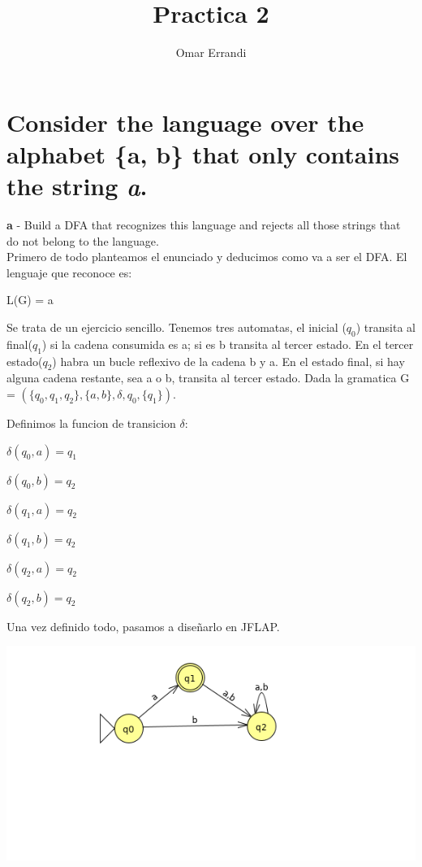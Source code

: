\documentclass{article}
\title{\textbf{Practica 2}}
\author{Omar Errandi}
\date{}
\begin{document}
\maketitle

\section{Consider the language over the alphabet \{a, b\} that only contains the string \emph a.
}
\textbf a - Build a DFA that recognizes this language and rejects all those strings that
do not belong to the language.
\\

Primero de todo planteamos  el enunciado y deducimos como va a ser el DFA. 
El lenguaje que reconoce es:

L(G) = a

Se trata de un ejercicio sencillo. Tenemos tres automatas, el inicial ($q_0$) transita al final($q_1$) si la cadena consumida es a; si es b transita al tercer estado. En el tercer estado($q_2$)  habra un bucle reflexivo de la cadena b y a. En el estado final, si  hay alguna cadena restante, sea a o b,  transita al tercer estado.
  Dada la gramatica G =  $(\{q_0,  q_1, q_2\}, \{a, b\}, \delta, q_0, \{q_1\})$.
  
  Definimos la funcion de transicion $\delta$:
  
  $\delta (q_0, a) =  q_1$
  
  $\delta (q_0, b) =  q_2$
  
  $\delta (q_1, a) =  q_2$
  
  $\delta (q_1, b) =  q_2$
  
  $\delta (q_2, a) =  q_2$
  
  $\delta (q_2, b) =  q_2$
  
  
  Una vez definido  todo, pasamos a diseñarlo en JFLAP.
  
  	\centering
	\includegraphics[scale=0.53]{DFA_P2}
	\flushleft
	
\end{document}
